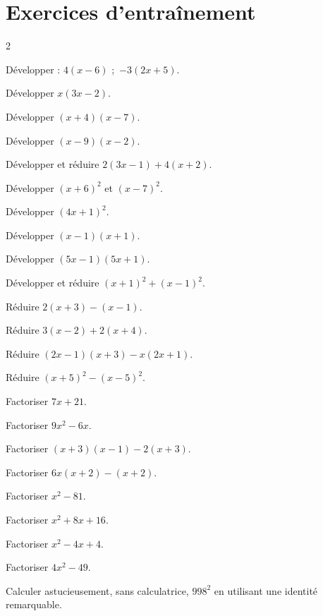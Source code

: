 \section{Exercices d'entraînement}
\begin{multicols}{2}

\exo{} Développer : $4(x-6)$ ;\ $-3(2x+5)$.

\exo{} Développer $x(3x-2)$.

\exo{} Développer $(x+4)(x-7)$.

\exo{} Développer $(x-9)(x-2)$.

\exo{} Développer et réduire $2(3x-1)+4(x+2)$.

\exo{} Développer $(x+6)^{2}$ et $(x-7)^{2}$.

\exo{} Développer $(4x+1)^{2}$.

\exo{} Développer $(x-1)(x+1)$.

\exo{} Développer $(5x-1)(5x+1)$.

\exo{} Développer et réduire $(x+1)^{2}+(x-1)^{2}$.

\exo{} Réduire $2(x+3)-(x-1)$.

\exo{} Réduire $3(x-2)+2(x+4)$.

\exo{} Réduire $(2x-1)(x+3)-x(2x+1)$.

\exo{} Réduire $(x+5)^{2}-(x-5)^{2}$.

\exo{} Factoriser $7x+21$.

\exo{} Factoriser $9x^{2}-6x$.

\exo{} Factoriser $(x+3)(x-1)-2(x+3)$.

\exo{} Factoriser $6x(x+2)-(x+2)$.

\exo{} Factoriser $x^{2}-81$.

\exo{} Factoriser $x^{2}+8x+16$.

\exo{} Factoriser $x^{2}-4x+4$.

\exo{} Factoriser $4x^{2}-49$.

\exo{} Calculer astucieusement, sans calculatrice, $998^{2}$ en utilisant une
identité remarquable.

\end{multicols}

